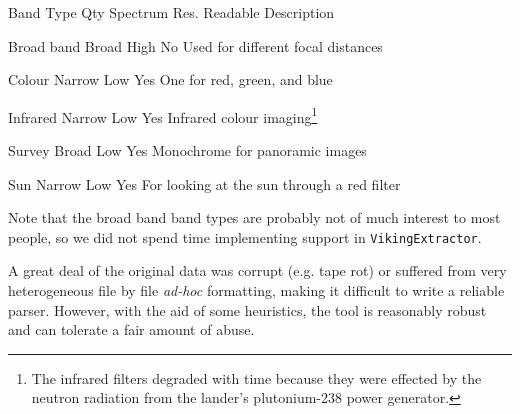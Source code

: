 {
    \bTABLE[split=repeat,option=stretch]
    \setupTABLE[column][6]
        [width=.38\textwidth,
        align=yes]
    \setupTABLE[row][each][align=center]
    \setupTABLE[4][1][align=center]

\bTABLEhead
    \bTR[bottomframe=on]
      \bTH  Band Type \eTH
      \bTH  Qty \eTH
      \bTH  Spectrum \eTH
      \bTH  Res. \eTH
      \bTH  Readable \eTH
      \bTH  Description \eTH
    \eTR
\eTABLEhead

\bTABLEbody
    \bTR
      \bTC Broad band \eTC
       \eTC
      \bTC Broad \eTC
      \bTC High \eTC
      \bTC No \eTC
      \bTC Used for different focal distances \eTC
    \eTR

    \bTR
      \bTC Colour \eTC
       \eTC
      \bTC Narrow \eTC
      \bTC Low \eTC
      \bTC Yes \eTC
      \bTC One for red, green, and blue \eTC
    \eTR

    \bTR
      \bTC Infrared \eTC
       \eTC
      \bTC Narrow \eTC
      \bTC Low \eTC
      \bTC Yes \eTC
      \bTC Infrared colour imaging\footnote{The infrared filters degraded with time because they were effected by the neutron radiation from the lander's plutonium-238 power generator.} \eTC
    \eTR

    \bTR
      \bTC Survey \eTC
       \eTC
      \bTC Broad \eTC
      \bTC Low \eTC
      \bTC Yes \eTC
      \bTC Monochrome for panoramic images \eTC
    \eTR
    
    \bTR
      \bTC Sun \eTC
       \eTC
      \bTC Narrow \eTC
      \bTC Low \eTC
      \bTC Yes \eTC
      \bTC For looking at the sun through a red filter \eTC
    \eTR

\eTABLEbody

\eTABLE
}

Note that the broad band band types are probably not of much interest to most people, so we did not spend time implementing support in {\tt VikingExtractor}.

A great deal of the original data was corrupt (e.g. tape rot) or suffered from very heterogeneous file by file {\it ad-hoc} formatting, making it difficult to write a reliable parser. However, with the aid of some heuristics, the tool is reasonably robust and can tolerate a fair amount of abuse.

